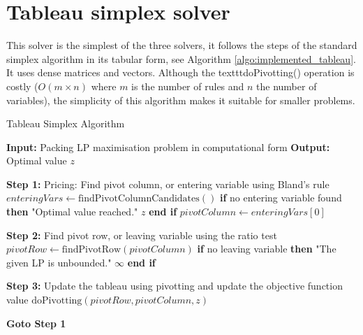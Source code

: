\section{Tableau simplex solver}
This solver is the simplest of the three solvers, it follows the steps of the standard simplex
algorithm in its tabular form, see Algorithm \ref{algo:implemented_tableau}. It uses dense matrices and vectors.
Although the
texttt{doPivotting()} operation is costly (\( O(m \times n) \) where $m$ is the number of rules and
$n$ the number of variables), the simplicity of this algorithm makes it suitable for
smaller problems.
\begin{algorithm}
    \caption{Tableau Simplex Algorithm}
    \begin{algorithmic}[1]
        \State \textbf{Input:} Packing LP maximisation problem in computational form
        \State \textbf{Output:} Optimal value $z$

        \State \textbf{Step 1:} Pricing: Find pivot column, or entering variable using Bland's rule
        \State \hspace{\algorithmicindent} $enteringVars \gets \text{findPivotColumnCandidates}()$
        \State \hspace{\algorithmicindent} \textbf{if} no entering variable found \textbf{then}
        \State \hspace{\algorithmicindent} \hspace{\algorithmicindent}  "Optimal value reached."
        \State \hspace{\algorithmicindent} \hspace{\algorithmicindent} \Return $z$
        \State \hspace{\algorithmicindent} \textbf{end if}
        \State \hspace{\algorithmicindent} $pivotColumn \gets enteringVars[0]$

        \State \textbf{Step 2:} Find pivot row, or leaving variable using the ratio test
        \State \hspace{\algorithmicindent} $pivotRow \gets \text{findPivotRow}(pivotColumn)$
        \State \hspace{\algorithmicindent} \textbf{if} no leaving variable \textbf{then}
        \State \hspace{\algorithmicindent} \hspace{\algorithmicindent}  "The given LP is unbounded."
        \State \hspace{\algorithmicindent} \hspace{\algorithmicindent} \Return $\infty$
        \State \hspace{\algorithmicindent} \textbf{end if}

        \State \textbf{Step 3:} Update the tableau using pivotting and update the objective function value
        \State \hspace{\algorithmicindent} $\text{doPivotting}(pivotRow, pivotColumn, z)$

        \State \textbf{Goto Step 1}
    \end{algorithmic}
    \label{algo:implemented_tableau}
\end{algorithm}
